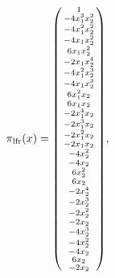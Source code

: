 \documentclass[fleqn]{article}
\begin{document}
\begin{equation}
\pi_{\mathrm{lfr}}(x) = \spmqty{
    1                \\
    -4x_{1}^3x_{2}^2 \\
    -4x_{1}^2x_{2}^2 \\
    -4x_{1}x_{2}^2   \\
    6x_{1}x_{2}^2    \\
    -2x_{1}x_{2}^4   \\
    -4x_{1}^2x_{2}^3 \\
    -4x_{1}x_{2}^3   \\
    6x_{1}^2x_{2}    \\
    6x_{1}x_{2}      \\
    -2x_{1}^4x_{2}   \\
    -2x_{1}^3x_{2}   \\
    -2x_{1}^2x_{2}   \\
    -2x_{1}x_{2}     \\
    -4x_{2}^2        \\
    -4x_{2}          \\
    6x_{2}^2         \\
    6x_{2}           \\
    -2x_{2}^4        \\
    -2x_{2}^3        \\
    -2x_{2}^2        \\
    -2x_{2}          \\
    -4x_{2}^3        \\
    -4x_{2}^2        \\
    -4x_{2}          \\
    6x_{2}           \\
    -2x_{2}          \\
}
,~

\end{equation}
\end{document}
